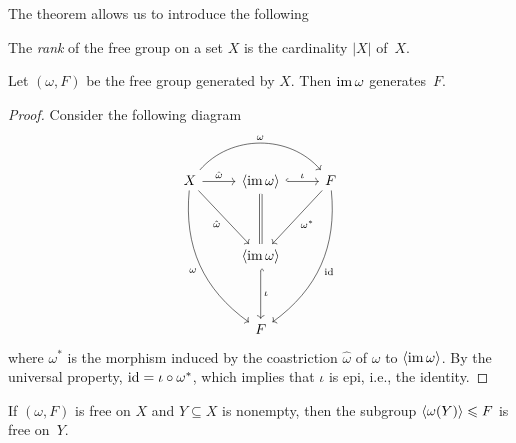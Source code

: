The theorem allows us to introduce the following

\begin{defn}
    The \textsl{rank} of the free group on a set $X$ is the cardinality $|X|$ of~$X$.
\end{defn}

\begin{prop}\label{X-generates-F}
    Let\/ $(\omega, F)$ be the free group generated by\/ $X$. Then\/ $\operatorname{im}\omega$ generates\/~$F$.
\end{prop}

\begin{proof} Consider the following diagram
    $$
        \begin{tikzcd}[row sep=huge]
            X
                    \arrow[rr,"\omega",bend left=49]
                    \arrow[rd,"\hat\omega"']
                    \arrow[r,"\hat\omega"]
                    \arrow[rdd,"\omega"',bend right]
                &\gen{\im\omega}
                    \arrow[r,"\iota",hook]
                    \arrow[d,equal]
                &F
                    \arrow[ld,"\omega^*"]
                    \arrow[ldd,"\id",bend left]\\
                &\gen{\im\omega}
                    \arrow[d,"\iota",hook]\\
                &F
        \end{tikzcd}
    $$
    where $\omega^*$ is the morphism induced by the coastriction $\hat\omega$ of $\omega$ to $\langle\operatorname{im}\omega\rangle$. By the universal property, $\operatorname{id}=\iota\circ\omega^*$, which implies that $\iota$ is epi, i.e., the identity.
\end{proof}

\begin{prop}
    If\/ $(\omega, F)$ is free on\/ $X$ and\/ $Y\subseteq X$ is nonempty, then the subgroup\/ $\langle\omega(Y)\rangle\leqslant F$ is free on\/~$Y$.
\end{prop}

